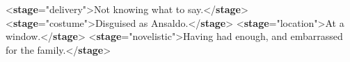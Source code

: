 \begin{shaded}
{<\textbf{stage}\hspace*{1em}{type}="{delivery}">}Not knowing what to say.{</\textbf{stage}>}\mbox{}\newline 
{<\textbf{stage}\hspace*{1em}{type}="{costume}">}Disguised as Ansaldo.{</\textbf{stage}>}\mbox{}\newline 
{<\textbf{stage}\hspace*{1em}{type}="{location}">}At a window.{</\textbf{stage}>}\mbox{}\newline 
{<\textbf{stage}\hspace*{1em}{type}="{novelistic}">}Having had enough, and embarrassed\mbox{}\newline 
 for the family.{</\textbf{stage}>}\end{shaded}\egroup\par \par
